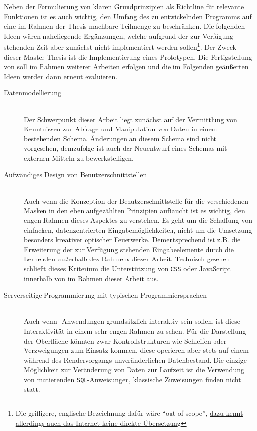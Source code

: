 Neben der Formulierung von klaren Grundprinzipien als Richtline für relevante Funktionen ist es auch wichtig, den Umfang des zu entwickelnden Programms auf eine im Rahmen der Thesis machbare Teilmenge zu beschränken. Die folgenden Ideen wären naheliegende Ergänzungen, welche aufgrund der zur Verfügung stehenden Zeit aber zunächst nicht implementiert werden sollen\footnote{Die griffigere, englische Bezeichnung dafür wäre "`out of scope"', \href{http://german.stackexchange.com/questions/31085/german-equivalent-to-out-of-scope/}{dazu kennt allerdings auch das Internet keine direkte Übersetzung}}. Der Zweck dieser Master-Thesis ist die Implementierung eines Prototypen. Die Fertigstellung von \idename{} soll im Rahmen weiterer Arbeiten erfolgen und die im Folgenden geäußerten Ideen werden dann erneut evaluieren.

\begin{description}
\item[Datenmodellierung] \label{scope:no-data-modelling} \hfill \\
  Der Schwerpunkt dieser Arbeit liegt zunächst auf der Vermittlung von Kenntnissen zur Abfrage und Manipulation von Daten in einem bestehenden Schema. Änderungen an diesem Schema sind nicht vorgesehen, demzufolge ist auch der Neuentwurf eines Schemas mit externen Mitteln zu bewerkstelligen.
\item[Aufwändiges Design von Benutzerschnittstellen] \label{scope:no-design} \hfill \\
  Auch wenn die Konzeption der Benutzerschnittstelle für die verschiedenen Masken in den eben aufgezählten Prinzipien auftaucht ist es wichtig, den engen Rahmen dieses Aspektes zu verstehen. Es geht um die Schaffung von einfachen, datenzentrierten Eingabemöglichkeiten, nicht um die Umsetzung besonders kreativer optischer Feuerwerke. Dementsprechend ist z.B. die Erweiterung der zur Verfügung stehenden Eingabeelemente durch die Lernenden außerhalb des Rahmens dieser Arbeit. Technisch gesehen schließt dieses Kriterium die Unterstützung von \texttt{CSS} oder JavaScript innerhalb von \idename{} im Rahmen dieser Arbeit aus.
\item[Serverseitige Programmierung mit typischen Programmiersprachen] \label{scope:no-programming} \hfill \\
  Auch wenn \idename{}-Anwendungen grundsätzlich interaktiv sein sollen, ist diese Interaktivität in einem sehr engen Rahmen zu sehen. Für die Darstellung der Oberfläche könnten zwar Kontrollstrukturen wie Schleifen oder Verzweigungen zum Einsatz kommen, diese operieren aber stets auf einem während des Rendervorgangs unveränderlichen Datenbestand. Die einzige Möglichkeit zur Veränderung von Daten zur Laufzeit ist die Verwendung von mutierenden \texttt{SQL}-Anweisungen, klassische Zuweisungen finden nicht statt.
\end{description}

